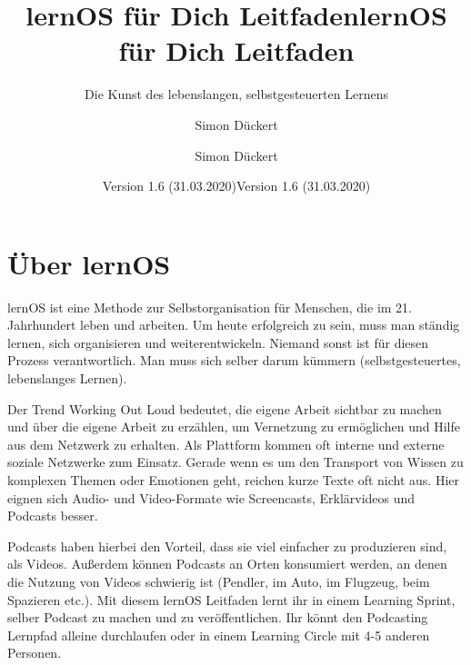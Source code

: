 \documentclass[
  ngerman,
  paper=a4,
,captions=tableheading
]{scrartcl}
\title{lernOS für Dich Leitfaden}
\subtitle{Die Kunst des lebenslangen, selbstgesteuerten Lernens}
\author{Simon Dückert}
\date{Version 1.6 (31.03.2020)}
\title{lernOS für Dich Leitfaden}
\author{Simon Dückert}
\date{Version 1.6 (31.03.2020)}
\begin{document}
\begin{titlepage}
\afterpage{\restorepagecolor}
\newcommand{\colorRule}[3][black]{\textcolor[HTML]{#1}{\rule{#2}{#3}}}
\end{titlepage}
\restoregeometry




{
\setcounter{tocdepth}{3}
\tableofcontents
\newpage
}
\hypertarget{uxfcber-lernos}{%
\section{Über lernOS}\label{uxfcber-lernos}}

lernOS ist eine Methode zur Selbstorganisation für Menschen, die im 21.
Jahrhundert leben und arbeiten. Um heute erfolgreich zu sein, muss man
ständig lernen, sich organisieren und weiterentwickeln. Niemand sonst
ist für diesen Prozess verantwortlich. Man muss sich selber darum
kümmern (selbstgesteuertes, lebenslanges Lernen).

Der Trend Working Out Loud bedeutet, die eigene Arbeit sichtbar zu
machen und über die eigene Arbeit zu erzählen, um Vernetzung zu
ermöglichen und Hilfe aus dem Netzwerk zu erhalten. Als Plattform kommen
oft interne und externe soziale Netzwerke zum Einsatz. Gerade wenn es um
den Transport von Wissen zu komplexen Themen oder Emotionen geht,
reichen kurze Texte oft nicht aus. Hier eignen sich Audio- und
Video-Formate wie Screencasts, Erklärvideos und Podcasts besser.

Podcasts haben hierbei den Vorteil, dass sie viel einfacher zu
produzieren sind, als Videos. Außerdem können Podcasts an Orten
konsumiert werden, an denen die Nutzung von Videos schwierig ist
(Pendler, im Auto, im Flugzeug, beim Spazieren etc.). Mit diesem lernOS
Leitfaden lernt ihr in einem Learning Sprint, selber Podcast zu machen
und zu veröffentlichen. Ihr könnt den Podcasting Lernpfad alleine
durchlaufen oder in einem Learning Circle mit 4-5 anderen Personen.
\end{document}
